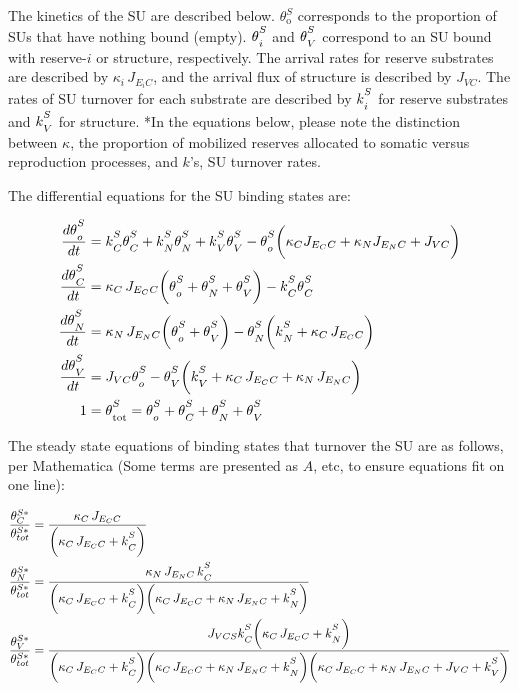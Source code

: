 \documentclass[
]{article}
\begin{document}
The kinetics of the SU are described below. \(\theta_{\text{o}}^S\)
corresponds to the proportion of SUs that have nothing bound (empty).
\({\theta\strut^{S}_{i}}\) and \({\theta\strut^{S}_{{V}}}\) correspond
to an SU bound with reserve-\(i\) or structure, respectively. The
arrival rates for reserve substrates are described by
\({\kappa_i}\,{J_{{E_i}C}}\), and the arrival flux of structure is
described by \(J_{{VC}}\). The rates of SU turnover for each substrate
are described by \({k\strut^S_i}\) for reserve substrates and
\({k\strut^S_V}\) for structure. *In the equations below, please note
the distinction between \(\kappa\), the proportion of mobilized reserves
allocated to somatic versus reproduction processes, and \(k\)'s, SU
turnover rates.

The differential equations for the SU binding states are:

\begin{align}
\frac{d{\theta\strut^{S}_{o}}}{dt} &= {k\strut^S_C}{\theta\strut^{S}_{{C}}} + {k\strut^S_N}{\theta\strut^{S}_{{N}}} + {k\strut^S_V}{\theta\strut^{S}_{{V}}} - {\theta\strut^{S}_{o}}\biggl({\kappa_C}{J_{{E_C}C}} + {\kappa_N}{J_{{E_N}C}} + J_{{VC}}\biggr)
\\
\frac{d{\theta\strut^{S}_C}}{dt} &= {\kappa_C}\,{J_{{E_C}C}}\biggl({\theta\strut^{S}_{o}} + {\theta\strut^{S}_{N}}  + {\theta\strut^{S}_{V}}\biggr) - {k\strut^S_C}{\theta\strut^{S}_{{C}}}
\\
\frac{d{\theta\strut^{S}_N}}{dt} &= {\kappa_N}\,{J_{{E_N}C}}\biggl({\theta\strut^{S}_{o}} + {\theta\strut^{S}_{V}}\biggr) - {\theta\strut^{S}_{{N}}}\biggl({k\strut^S_N} + {\kappa_C}\,{J_{{E_C}C}}\biggr)
\\
\frac{d{\theta\strut^{S}_V}}{dt} &= J_{{VC}}{\theta\strut^{S}_{o}} - {\theta\strut^{S}_{{V}}}\biggl({k\strut^S_V} +  {\kappa_C}\,{J_{{E_C}C}} + {\kappa_N}\,{J_{{E_N}C}}\biggr)
\\
1 &= {\theta\strut^{S}_{\text{tot}}} = {\theta\strut^{S}_{o}} + {\theta\strut^{S}_{{C}}} + {\theta\strut^{S}_{N}} + {\theta\strut^{S}_{V}}
\end{align}

The steady state equations of binding states that turnover the SU are as
follows, per Mathematica (Some terms are presented as \(A\), etc, to
ensure equations fit on one line):

\begin{align}
\frac{\theta^{S*}_C}{\theta^{S*}_{tot}} &= \frac{{\kappa_C}\,{J_{{E_C}C}}}{\biggl({\kappa_C}\,{J_{{E_C}C}} + {k\strut^S_C}\biggr)}
\\
\frac{\theta^{S*}_N}{\theta^{S*}_{tot}}&= \frac{{\kappa_N}\,{J_{{E_N}C}}\,{k\strut^S_C}}{\biggl({\kappa_C}\,{J_{{E_C}C}} + {k\strut^S_C}\biggr)\biggl({\kappa_C}\,{J_{{E_C}C}} + {\kappa_N}\,{J_{{E_N}C}} + {k\strut^S_N}\biggr)}
\\
\frac{\theta^{S*}_V}{\theta^{S*}_{tot}}&= \frac{J_{{VCS}}{k\strut^S_C}\biggl({\kappa_C}\,{J_{{E_C}C}} + {k\strut^S_N}\biggr)}{\biggl({\kappa_C}\,{J_{{E_C}C}} + {k\strut^S_C}\biggr)\biggl({\kappa_C}\,{J_{{E_C}C}} + {\kappa_N}\,{J_{{E_N}C}} + {k\strut^S_N}\biggr)\biggl({\kappa_C}\,{J_{{E_C}C}} + {\kappa_N}\,{J_{{E_N}C}} + J_{VC} + {k\strut^S_V}\biggr)}
\end{align}
\end{document}
